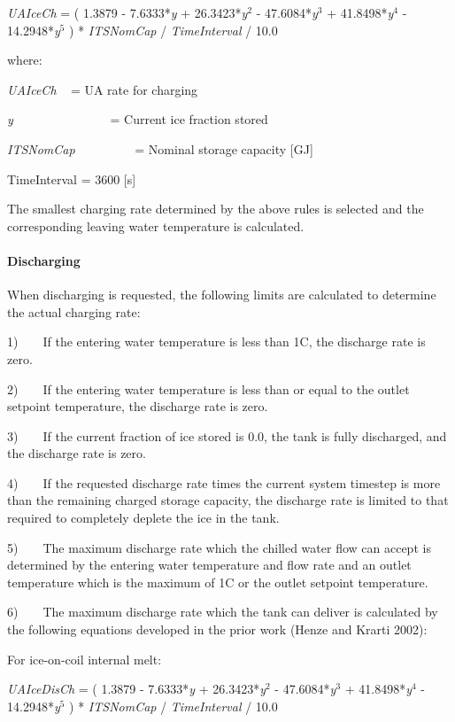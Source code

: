 \emph{UAIceCh} = ( 1.3879 - 7.6333*\emph{y} + 26.3423*\emph{y}\(^{2}\) - 47.6084*\emph{y}\(^{3}\) + 41.8498*\emph{y}\(^{4}\) - 14.2948*\emph{y}\(^{5}\) ) * \emph{ITSNomCap} / \emph{TimeInterval} / 10.0

where:

\emph{UAIceCh} ~ = UA rate for charging

\emph{y}~~~~~~~~~~~~~~~ = Current ice fraction stored

\emph{ITSNomCap}~~~~~~~~~ = Nominal storage capacity {[}GJ{]}

TimeInterval = 3600 {[}s{]}

The smallest charging rate determined by the above rules is selected and the corresponding leaving water temperature is calculated.

\paragraph{Discharging}\label{discharging}

When discharging is requested, the following limits are calculated to determine the actual charging rate:

1)~~~~If the entering water temperature is less than 1C, the discharge rate is zero.

2)~~~~If the entering water temperature is less than or equal to the outlet setpoint temperature, the discharge rate is zero.

3)~~~~If the current fraction of ice stored is 0.0, the tank is fully discharged, and the discharge rate is zero.

4)~~~~If the requested discharge rate times the current system timestep is more than the remaining charged storage capacity, the discharge rate is limited to that required to completely deplete the ice in the tank.

5)~~~~The maximum discharge rate which the chilled water flow can accept is determined by the entering water temperature and flow rate and an outlet temperature which is the maximum of 1C or the outlet setpoint temperature.

6)~~~~The maximum discharge rate which the tank can deliver is calculated by the following equations developed in the prior work (Henze and Krarti 2002):

For ice-on-coil internal melt:

\emph{UAIceDisCh} = ( 1.3879 - 7.6333*\emph{y} + 26.3423*\emph{y}\(^{2}\) - 47.6084*\emph{y}\(^{3}\) + 41.8498*\emph{y}\(^{4}\) - 14.2948*\emph{y}\(^{5}\) ) * \emph{ITSNomCap} / \emph{TimeInterval} / 10.0


